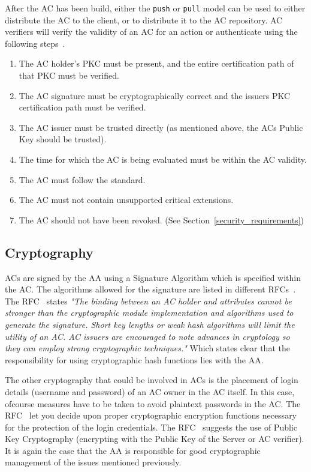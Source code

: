\documentclass[10pt,conference,a4paper]{IEEEtran}
\begin{document}
After the AC has been build, either the \texttt{push} or \texttt{pull} model can be used to either distribute the AC to the client, or to distribute it to the AC repository. AC verifiers will verify the validity of an AC for an action or authenticate using the following steps~\cite{rfc_ac}.
\begin{enumerate}
	\item The AC holder's PKC must be present, and the entire certification path of that PKC must be verified.
	\item The AC signature must be cryptographically correct and the issuers PKC certification path must be verified.
	\item The AC issuer must be trusted directly (as mentioned above, the ACs Public Key should be trusted).
	\item The time for which the AC is being evaluated must be within the AC validity.
	\item The AC must follow the standard.
	\item The AC must not contain unsupported critical extensions.
	\item The AC should not have been revoked. (See Section~\ref{security_requirements})
\end{enumerate}

\subsection{Cryptography}
ACs are signed by the AA using a Signature Algorithm which is specified within the AC. The algorithms allowed for the signature are listed in different RFCs~\cite{rfc_alg1,rfc_alg2,rfc_alg3,rfc_alg4}. The RFC~\cite{rfc_ac} states \textit{"The binding between an AC holder and attributes cannot be stronger than the cryptographic module implementation and algorithms used to generate the signature.  Short key lengths or weak hash algorithms will limit the utility of an AC. AC issuers are encouraged to note advances in cryptology so they can employ strong cryptographic techniques."} Which states clear that the responsibility for using cryptographic hash functions lies with the AA.

The other cryptography that could be involved in ACs is the placement of login details (username and password) of an AC owner in the AC itself. In this case, ofcourse measures have to be taken to avoid plaintext passwords in the AC. The RFC~\cite{rfc_ac} let you decide upon proper cryptographic encryption functions necessary for the protection of the login credentials. The RFC~\cite{rfc_ac} suggests the use of Public Key Cryptography (encrypting with the Public Key of the Server or AC verifier). It is again the case that the AA is responsible for good cryptographic management of the issues mentioned previously.
\end{document}
